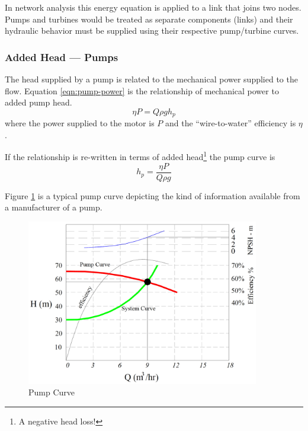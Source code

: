 In network analysis this energy equation is applied to a link that joins two nodes.
Pumps and turbines would be treated as separate components (links) and their hydraulic behavior must be supplied using their respective pump/turbine curves.

\subsubsection{Added Head --- Pumps}
The head supplied by a pump is related to the mechanical power supplied to the flow.   Equation \ref{eqn:pump-power} is the relationship of mechanical power to added pump head.
\begin{equation}
\eta P=Q\rho g h_p
\label{eqn:pump-power}
\end{equation}
where the power supplied to the motor is $P$ and the  ``wire-to-water'' efficiency is $\eta$.

If the relationship is re-written in terms of added head\footnote{A negative head loss!} the pump curve is 
\begin{equation}
h_p = \frac{\eta P}{Q\rho g}
\label{eqn:pump-curve22}
\end{equation}

Figure \ref{fig:PumpCurve} is a typical pump curve depicting the kind of information available from a manufacturer of a pump.

\begin{figure}[h!] %
   \centering
   \includegraphics[width=4in]{./10-PumpsAndValves/PumpCurve.jpg} 
   \caption{Pump Curve}
   \label{fig:PumpCurve}
\end{figure}

